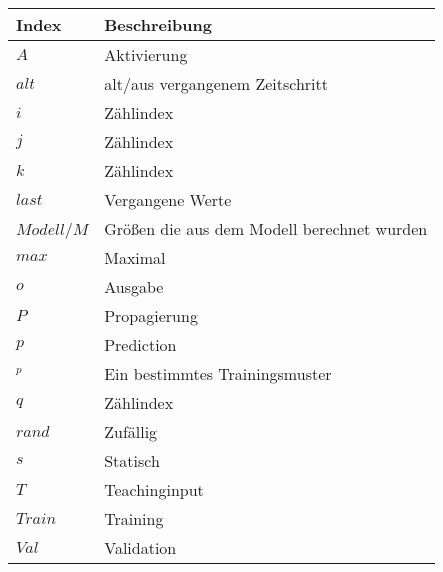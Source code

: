     \begin{longtable}[l]{p{3cm}|p{12cm}}
        Index & Beschreibung\\
        \hline
        $A$ & Aktivierung\\
        $alt$ & alt/aus vergangenem Zeitschritt\\
        $i$ & Zählindex\\
        $j$ & Zählindex\\
        $k$ & Zählindex\\
        $last$ & Vergangene Werte\\
        $Modell$/$M$ & Größen die aus dem Modell berechnet wurden\\
        $max$ & Maximal\\
        $o$ & Ausgabe\\
        $P$ & Propagierung\\
        $p$ & Prediction\\
        $^p$ & Ein bestimmtes Trainingsmuster\\
        $q$ & Zählindex\\
        $rand$ & Zufällig\\  
        $s$ & Statisch\\
        $T$ & Teachinginput \\
        $Train$ & Training\\
        $Val$ & Validation\\            
        
        
    \end{longtable}
